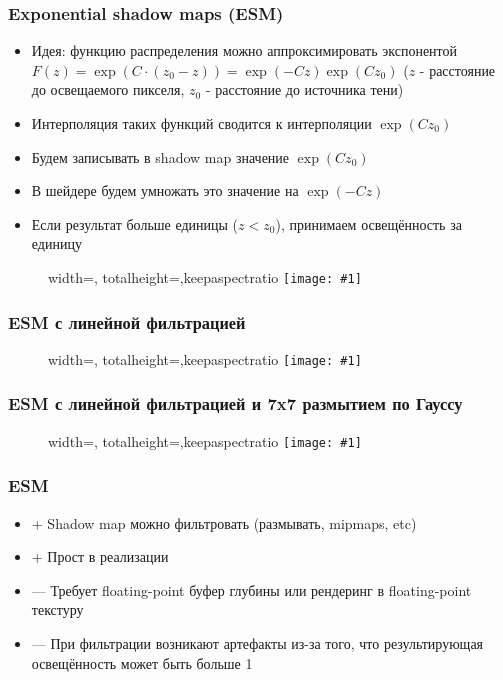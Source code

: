 \documentclass{beamer}
\newcommand{\slideimage}[1]{
  \begin{figure}
    \begin{adjustbox}{width=\textwidth, totalheight=\textheight-2\baselineskip-2\baselineskip,keepaspectratio}
      \texttt{[image: \#1]}
    \end{adjustbox}
  \end{figure}
}
\begin{document}
\begin{frame}[fragile]
\frametitle{Exponential shadow maps (ESM)}
\begin{itemize}
\item Идея: функцию распределения можно аппроксимировать экспонентой \begin{math}F(z) = \exp(C \cdot (z_0 - z)) = \exp(-Cz)\exp(Cz_0)\end{math} (\begin{math}z\end{math} - расстояние до освещаемого пикселя, \begin{math}z_0\end{math} - расстояние до источника тени)
\pause
\item Интерполяция таких функций сводится к интерполяции \begin{math}\exp(Cz_0)\end{math}
\pause
\item Будем записывать в shadow map значение \begin{math}\exp(Cz_0)\end{math}
\pause
\item В шейдере будем умножать это значение на \begin{math}\exp(-Cz)\end{math}
\pause
\item Если результат больше единицы (\begin{math}z < z_0\end{math}), принимаем освещённость за единицу
\pause
\end{itemize}
\slideimage{exp_plot.png}
\end{frame}

\begin{frame}[fragile]
\frametitle{ESM с линейной фильтрацией}
\slideimage{exp.png}
\end{frame}

\begin{frame}[fragile]
\frametitle{ESM с линейной фильтрацией и 7x7 размытием по Гауссу}
\slideimage{exp_gauss.png}
\end{frame}

\begin{frame}[fragile]
\frametitle{ESM}
\begin{itemize}
\item {\color{green}+} Shadow map можно фильтровать (размывать, mipmaps, etc)
\item {\color{green}+} Прост в реализации
\item {\color{red}—} Требует floating-point буфер глубины или рендеринг в floating-point текстуру
\item {\color{red}—} При фильтрации возникают артефакты из-за того, что результирующая освещённость может быть больше 1
\end{itemize}
\end{frame}
\end{document}
